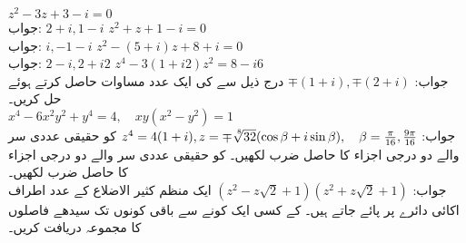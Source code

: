 \quad
$z^2-3z+3-i=0$\\
جواب:\quad
$2+i,1-i$
\quad
$z^2+z+1-i=0$\\
جواب:\quad
$i,-1-i$
\quad
$z^2-(5+i)z+8+i=0$\\
جواب:\quad
$2-i,2+i2$
\quad
$z^4-3(1+i2)z^2=8-i6$\\
جواب:\quad
$\mp (1+i), \mp(2+i)$
\quad
درج ذیل سے  کی ایک عدد مساوات حاصل کرتے ہوئے حل کریں۔\\
 $x^4-6x^2y^2+y^4=4,\quad xy(x^2-y^2)=1$\\
جواب:\quad
$z^4=4(1+i), z=\mp \sqrt[\leftroot{-2}\uproot{2}8]{32}(\cos\beta+i\sin\beta),\quad \beta=\tfrac{\pi}{16}, \tfrac{9\pi}{16}$
\quad
{} کو حقیقی عددی سر والے دو درجی اجزاء کا حاصل ضرب لکھیں۔
\quad
{} کو حقیقی عددی سر والے دو درجی اجزاء کا حاصل ضرب لکھیں۔\\
جواب:\quad
$(z^2-z\sqrt{2}+1)(z^2+z\sqrt{2}+1)$
\quad
ایک منظم کثیر الاضلاع  کے  عدد اطراف اکائی دائرے پر پائے جاتے ہیں۔ کے کسی ایک کونے سے باقی  کونوں تک سیدھے فاصلوں کا مجموعہ دریافت کریں۔

